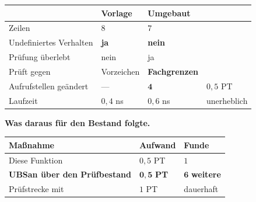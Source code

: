 \begin{merksatz}
\begin{center}
{\small
\renewcommand{\arraystretch}{1.45}
\begin{tabular}{@{}P{2.8cm}P{2.0cm}P{2.2cm}P{2.0cm}@{}}
\toprule
& \textbf{Vorlage} & \textbf{Umgebaut} & \\
\midrule
Zeilen & $8$ & $7$ & \\
Undefiniertes Verhalten & \textcolor{akzent}{\textbf{ja}} & \textcolor{gruen}{\textbf{nein}} & \\
Prüfung überlebt  & \textcolor{akzent}{nein} & \textcolor{gruen}{ja} & \\
Prüft gegen & \textcolor{akzent}{Vorzeichen} & \textcolor{gruen}{\textbf{Fachgrenzen}} & \\
Aufrufstellen geändert & --- & $\mathbf{4}$ & $0{,}5$ PT\\
Laufzeit & $0{,}4$ ns & $0{,}6$ ns & \textcolor{gruen}{unerheblich}\\
\bottomrule
\end{tabular}}
\end{center}

\begin{center}
\begin{minipage}{0.88\textwidth}
\end{minipage}
\end{center}

\textbf{Was daraus für den Bestand folgte.}

\begin{center}
\renewcommand{\arraystretch}{1.45}
\begin{tabular}{@{}P{3.0cm}P{2.2cm}P{2.6cm}@{}}
\toprule
\textbf{Maßnahme} & \textbf{Aufwand} & \textbf{Funde}\\
\midrule
Diese Funktion & $0{,}5$ PT & $1$\\
\textbf{UBSan über den Prüfbestand} & \textcolor{gruen}{$\mathbf{0{,}5}$ \textbf{PT}} & \textcolor{akzent}{$\mathbf{6}$ \textbf{weitere}}\\
Prüfstrecke mit  & $1$ PT & \textcolor{gruen}{dauerhaft}\\
\bottomrule
\end{tabular}
\end{center}

\begin{center}
\end{center}
\end{merksatz}

